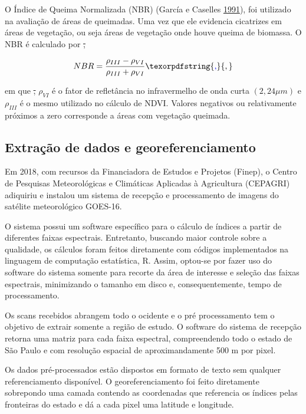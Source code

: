 \documentclass[11pt,brazil,]{article}
\providecommand{\DIFaddtex}[1]{{\protect\color{blue}\uwave{#1}}} %
\providecommand{\DIFdeltex}[1]{{\protect\color{red}\sout{#1}}}                      %
\providecommand{\DIFaddbegin}{} %
\providecommand{\DIFaddend}{} %
\providecommand{\DIFdelbegin}{} %
\providecommand{\DIFdelend}{} %
\providecommand{\DIFadd}[1]{\texorpdfstring{\DIFaddtex{#1}}{#1}} %
\providecommand{\DIFdel}[1]{\texorpdfstring{\DIFdeltex{#1}}{}} %
\newcommand{\DIFscaledelfig}{0.5}
\newlength{\DIFdelgraphicswidth} %
\newlength{\DIFdelgraphicsheight} %
\newcommand{\DIFaddincludegraphics}[2][]{{\color{blue}\fbox{\DIFOincludegraphics[#1]{#2}}}} %
\newcommand{\DIFdelincludegraphics}[2][]{%
\sbox{\DIFdelgraphicsbox}{\DIFOincludegraphics[#1]{#2}}%
\settoboxwidth{\DIFdelgraphicswidth}{\DIFdelgraphicsbox} %
\settoboxtotalheight{\DIFdelgraphicsheight}{\DIFdelgraphicsbox} %
\scalebox{\DIFscaledelfig}{%
\parbox[b]{\DIFdelgraphicswidth}{\usebox{\DIFdelgraphicsbox}\\[-\baselineskip] \rule{\DIFdelgraphicswidth}{0em}}\llap{\resizebox{\DIFdelgraphicswidth}{\DIFdelgraphicsheight}{%
\setlength{\unitlength}{\DIFdelgraphicswidth}%
\begin{picture}(1,1)%
\thicklines\linethickness{2pt} %
{\color[rgb]{1,0,0}\put(0,0){\framebox(1,1){}}}%
{\color[rgb]{1,0,0}\put(0,0){\line( 1,1){1}}}%
{\color[rgb]{1,0,0}\put(0,1){\line(1,-1){1}}}%
\end{picture}%
}\hspace*{3pt}}} %
} %
\DeclareRobustCommand{\DIFaddbegin}{\DIFOaddbegin \let\includegraphics\DIFaddincludegraphics} %
\DeclareRobustCommand{\DIFaddend}{\DIFOaddend \let\includegraphics\DIFOincludegraphics} %
\DeclareRobustCommand{\DIFdelbegin}{\DIFOdelbegin \let\includegraphics\DIFdelincludegraphics} %
\DeclareRobustCommand{\DIFdelend}{\DIFOaddend \let\includegraphics\DIFOincludegraphics} %
\begin{document}
O Índice de Queima Normalizada (NBR) (García e Caselles
\protect\hyperlink{ref-garcia1991mapping}{1991}), foi utilizado na
avaliação de áreas de queimadas. Uma vez que ele evidencia cicatrizes em
áreas de vegetação, ou seja áreas de vegetação onde houve queima de
biomassa. O NBR é calculado por
\DIFdelbegin \DIFdel{,
}\DIFdelend 

\[ NBR=\frac{\rho_{III} - \rho_{VI}}{\rho_{III} + \rho_{VI}}\DIFaddbegin \DIFadd{, }\DIFaddend \]

em que \DIFdelbegin \DIFdel{, }\DIFdelend \(\rho_{VI}\) é o fator de refletância no infravermelho de onda
curta \((2,24 \mu m)\) e \(\rho_{III}\) é o mesmo utilizado no cálculo
de NDVI. Valores negativos ou relativamente próximos a zero corresponde
a áreas com vegetação queimada.

\hypertarget{extracao-de-dados-e-georeferenciamento}{%
\subsection{Extração de dados e
georeferenciamento}\label{extracao-de-dados-e-georeferenciamento}}

Em 2018, com recursos da Financiadora de Estudos e Projetos (Finep), o
Centro de Pesquisas Meteorológicas e Climáticas Aplicadas à Agricultura
(CEPAGRI) adiquiriu e instalou um sistema de recepção e processamento de
imagens do satélite meteorológico GOES-16.

O sistema possui um software específico para o cálculo de índices a
partir de diferentes faixas espectrais. Entretanto, buscando maior
controle sobre a qualidade, os cálculos foram feitos diretamente com
códigos implementados na linguagem de computação estatística, R. Assim,
optou-se por fazer uso do software do sistema somente para recorte da
área de interesse e seleção das faixas espectrais, minimizando o tamanho
em disco e, consequentemente, tempo de processamento.

Os scans recebidos abrangem todo o ocidente e o pré processamento tem o
objetivo de extrair somente a região de estudo. O software do sistema de
recepção retorna uma matriz para cada faixa espectral, compreendendo
todo o estado de São Paulo e com resolução espacial de aproximandamente
500 m por pixel.

Os dados pré-processados estão dispostos em formato de texto sem
qualquer referenciamento disponível. O georeferenciamento foi feito
diretamente sobrepondo uma camada contendo as coordenadas que referencia
os índices pelas fronteiras do estado e dá a cada pixel uma latitude e
longitude.
\end{document}
